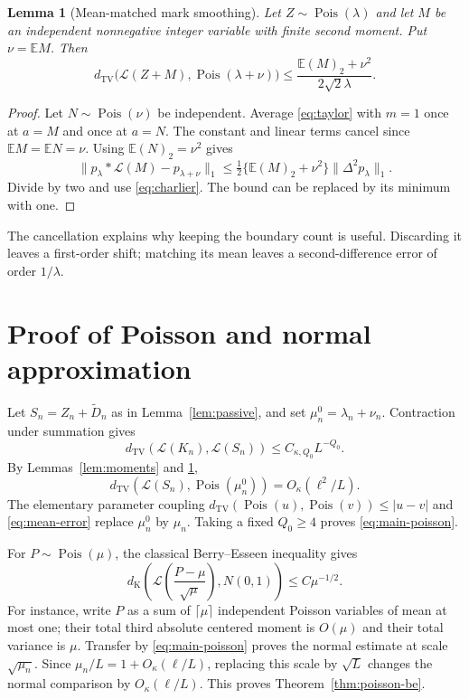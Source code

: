 \documentclass[11pt]{article}
\newcommand{\E}{\mathbb E}
\newcommand{\Pois}{\operatorname{Pois}}
\newcommand{\TV}{d_{\mathrm{TV}}}
\newcommand{\Kol}{d_{\mathrm K}}
\newcommand{\Law}{\mathcal L}
\newtheorem{lemma}[theorem]{Lemma}
\theoremstyle{remark}
\begin{document}
\begin{lemma}[Mean-matched mark smoothing]\label{lem:smooth2}
Let $Z\sim\Pois(\lambda)$ and let $M$ be an independent nonnegative integer variable with finite second moment. Put $\nu=\E M$. Then
\begin{equation}\label{eq:smooth2}
 \TV\bigl(\Law(Z+M),\Pois(\lambda+\nu)\bigr)
 \le\frac{\E(M)_2+\nu^2}{2\sqrt2\lambda}.
\end{equation}
\end{lemma}
\begin{proof}
Let $N\sim\Pois(\nu)$ be independent. Average \eqref{eq:taylor} with $m=1$ once at $a=M$ and once at $a=N$. The constant and linear terms cancel since $\E M=\E N=\nu$. Using $\E(N)_2=\nu^2$ gives
\[
 \|p_\lambda*\Law(M)-p_{\lambda+\nu}\|_1
 \le\tfrac12\{\E(M)_2+\nu^2\}\|\Delta^2p_\lambda\|_1.
\]
Divide by two and use \eqref{eq:charlier}. The bound can be replaced by its minimum with one.
\end{proof}
The cancellation explains why keeping the boundary count is useful. Discarding it leaves a first-order shift; matching its mean leaves a second-difference error of order $1/\lambda$.

\section{Proof of Poisson and normal approximation}\label{sec:be}
Let $S_n=Z_n+\widetilde D_n$ as in Lemma~\ref{lem:passive}, and set $\mu_n^0=\lambda_n+\nu_n$. Contraction under summation gives
\[
 \TV(\Law(K_n),\Law(S_n))\le C_{\kappa,Q_0}L^{-Q_0}.
\]
By Lemmas~\ref{lem:moments} and \ref{lem:smooth2},
\[
 \TV(\Law(S_n),\Pois(\mu_n^0))=O_\kappa(\ell^2/L).
\]
The elementary parameter coupling $\TV(\Pois(u),\Pois(v))\le|u-v|$ and \eqref{eq:mean-error} replace $\mu_n^0$ by $\mu_n$. Taking a fixed $Q_0\ge4$ proves \eqref{eq:main-poisson}.

For $P\sim\Pois(\mu)$, the classical Berry--Esseen inequality gives
\begin{equation}\label{eq:poisson-be}
 \Kol\left(\Law\left(\frac{P-\mu}{\sqrt\mu}\right),N(0,1)\right)
 \le C\mu^{-1/2}.
\end{equation}
For instance, write $P$ as a sum of $\lceil\mu\rceil$ independent Poisson variables of mean at most one; their total third absolute centered moment is $O(\mu)$ and their total variance is $\mu$. Transfer by \eqref{eq:main-poisson} proves the normal estimate at scale $\sqrt{\mu_n}$. Since $\mu_n/L=1+O_\kappa(\ell/L)$, replacing this scale by $\sqrt L$ changes the normal comparison by $O_\kappa(\ell/L)$. This proves Theorem~\ref{thm:poisson-be}.
\end{document}

